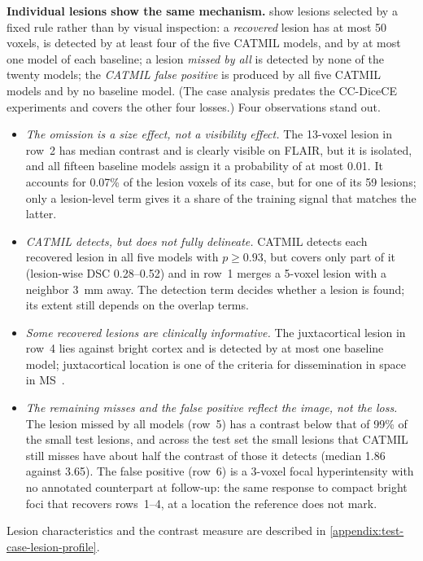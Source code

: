 \textbf{Individual lesions show the same mechanism.}
 show lesions
selected by a fixed rule rather than by visual inspection: a
\emph{recovered} lesion has at most 50 voxels, is detected by at least four
of the five CATMIL models, and by at most one model of each baseline; a
lesion \emph{missed by all} is detected by none of the twenty models; the
\emph{CATMIL false positive} is produced by all five CATMIL models and by no
baseline model. (The case analysis predates the CC-DiceCE experiments and
covers the other four losses.) Four observations stand out.
\begin{itemize}
\item \emph{The omission is a size effect, not a visibility effect.} The
13-voxel lesion in row~2 has median contrast and is clearly visible on
FLAIR, but it is isolated, and all fifteen baseline models assign it a
probability of at most 0.01. It accounts for 0.07\% of the lesion voxels
of its case, but for one of its 59 lesions; only a lesion-level term gives
it a share of the training signal that matches the latter.
\item \emph{CATMIL detects, but does not fully delineate.} CATMIL detects
each recovered lesion in all five models with $p \geq 0.93$, but covers
only part of it (lesion-wise DSC 0.28--0.52) and in row~1 merges a
5-voxel lesion with a neighbor 3~mm away. The detection term decides
whether a lesion is found; its extent still depends on the overlap terms.
\item \emph{Some recovered lesions are clinically informative.} The
juxtacortical lesion in row~4 lies against bright cortex and is detected
by at most one baseline model; juxtacortical location is one of the
criteria for dissemination in space in
MS~\cite{thompson_diagnosis_2018}.
\item \emph{The remaining misses and the false positive reflect the image,
not the loss.} The lesion missed by all models (row~5) has a contrast below
that of 99\% of the small test lesions, and across the test set the small
lesions that CATMIL still misses have about half the contrast of those it
detects (median 1.86 against 3.65). The false positive (row~6) is a 3-voxel
focal hyperintensity with no annotated counterpart at follow-up: the same
response to compact bright foci that recovers rows~1--4, at a location the
reference does not mark.
\end{itemize}
Lesion characteristics and the contrast measure are described in
\cref{appendix:test-case-lesion-profile}.

